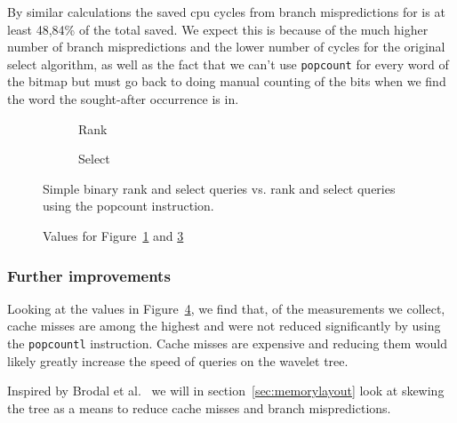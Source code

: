 By similar calculations the saved cpu cycles from branch mispredictions for  is at least 48,84\% of the total saved. We expect this is because of the much higher number of branch mispredictions and the lower number of cycles for the original select algorithm, as well as the fact that we can't use \texttt{popcount} for every word of the bitmap but must go back to doing manual counting of the bits when we find the word the sought-after occurrence is in.


\begin{figure}\tiny
	\begin{subfigure}{0.48\textwidth}
		
		\caption{Rank}
		\label{fig:rankPopcountDiff}
	\end{subfigure}
	\hfill
	\begin{subfigure}{0.48\textwidth}
		
		\caption{Select}
		\label{fig:selectPopcountDiff}
	\end{subfigure}
	\caption{Simple binary rank and select queries vs. rank and select queries using the popcount instruction.}
\end{figure}
\begin{figure}
\center
	\caption{Values for Figure~\ref{fig:rankPopcountDiff} and \ref{fig:selectPopcountDiff}}
	\label{fig:valuesForPopcountDiff}
	
\end{figure}

\restoregeometry




\subsubsection{Further improvements}
Looking at the values in Figure~\ref{fig:valuesForPopcountDiff}, we find that, of the measurements we collect, cache misses are among the highest and were not reduced significantly by using the \texttt{popcountl} instruction.
Cache misses are expensive and reducing them would likely greatly increase the speed of queries on the wavelet tree.

Inspired by Brodal et al.~\cite{gerthSkewedBinarySearchTrees} we will in section~\ref{sec:memorylayout} look at skewing the tree as a means to reduce cache misses and branch mispredictions.

